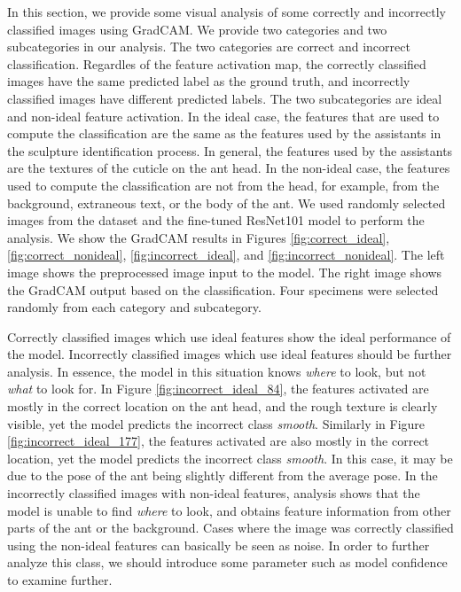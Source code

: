 \documentclass[12pt]{article}
\begin{document}
In this section, we provide some visual analysis of some correctly and
incorrectly classified images using GradCAM. We provide two categories and two
subcategories in our analysis. The two categories are correct and incorrect
classification. Regardles of the feature activation map, the correctly
classified images have the same predicted label as the ground truth, and
incorrectly classified images have different predicted labels. The two
subcategories are ideal and non-ideal feature activation. In the ideal case, the
features that are used to compute the classification are the same as the
features used by the assistants in the sculpture identification process. In
general, the features used by the assistants are the textures of the cuticle on
the ant head. In the non-ideal case, the features used to compute the
classification are not from the head, for example, from the background,
extraneous text, or the body of the ant. We used randomly selected images from
the dataset and the fine-tuned ResNet101 model to perform the analysis. We show
the GradCAM results in Figures \ref{fig:correct_ideal},
\ref{fig:correct_nonideal}, \ref{fig:incorrect_ideal}, and
\ref{fig:incorrect_nonideal}. The left image shows the preprocessed image input
to the model. The right image shows the GradCAM output based on the
classification. Four specimens were selected randomly from each category and
subcategory.

Correctly classified images which use ideal features show the ideal performance
of the model. Incorrectly classified images which use ideal features should be
further analysis. In essence, the model in this situation knows \textit{where}
to look, but not \textit{what} to look for. In Figure
\ref{fig:incorrect_ideal_84}, the features activated are mostly in the correct
location on the ant head, and the rough texture is clearly visible, yet the
model predicts the incorrect class \textit{smooth}. Similarly in Figure
\ref{fig:incorrect_ideal_177}, the features activated are also mostly in the
correct location, yet the model predicts the incorrect class \textit{smooth}. In
this case, it may be due to the pose of the ant being slightly different from
the average pose. In the incorrectly classified images with non-ideal features,
analysis shows that the model is unable to find \textit{where} to look, and
obtains feature information from other parts of the ant or the background. Cases
where the image was correctly classified using the non-ideal features can
basically be seen as noise. In order to further analyze this class, we should
introduce some parameter such as model confidence to examine further.
\end{document}
